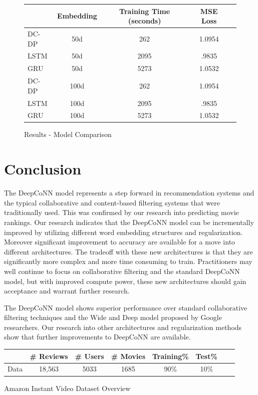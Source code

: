 \documentclass[10pt,twocolumn,letterpaper]{article}
\begin{document}
\begin{figure}[!h]
\begin{center}
{\small
\begin{tabular}{l|cccc}
\hline
 & Embedding & Training Time (seconds) & MSE Loss \\
\hline
DC-DP & 50d & 262 & 1.0954   \\
LSTM & 50d & 2095 & .9835  \\
GRU & 50d & 5273 & 1.0532  \\
DC-DP & 100d  & 262 & 1.0954   \\
LSTM & 100d & 2095 & .9835  \\
GRU & 100d & 5273 & 1.0532  \\
\hline
\end{tabular}
}
\end{center}
\caption{Results - Model Comparison}
\end{figure}


\section{Conclusion}

The DeepCoNN model represents a step forward in recommendation systems and the typical collaborative and content-based filtering systems that were traditionally used. This was confirmed by our research into predicting movie rankings. Our research indicates that the DeepCoNN model can be incrementally improved by utilizing different word embedding structures and regularization. Moreover significant improvement to accuracy are available for a move into different architectures. The tradeoff with these new architectures is that they are significantly more complex and more time consuming to train. Practitioners may well continue to focus on collaborative filtering and the standard DeepCoNN model, but with improved compute power, these new architectures should gain acceptance and warrant further research.  

The DeepCoNN model shows superior performance over standard collaborative filtering techniques and the Wide and Deep model proposed by Google researchers. Our research into other architectures and regularization methods show that further improvements to DeepCoNN are available.   




\begin{exhibit}
\begin{center}
{\small
\begin{tabular}{l|ccccccc}
\hline
 & \# Reviews & \# Users & \# Movies & Training\% & Test\% \\
\hline
Data & 18,563  & 5033 & 1685 & 90\% & 10\%  \\
\hline
\end{tabular}
}
\end{center}
\caption{Amazon Instant Video Dataset Overview}
\end{exhibit}
\end{document}
